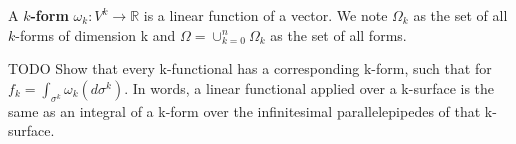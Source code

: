 \begin{defn}
	A \textbf{$k$-form} $\omega_k : V^k \to \mathbb{R}$ is a linear function of a vector. We note $\Omega_k$ as the set of all $k$-forms of dimension k and $\Omega = \cup_{k=0}^n\Omega_k$ as the set of all forms. 
\end{defn}

\begin{prop}
	TODO Show that every k-functional has a corresponding k-form, such that for $f_k = \int_{\sigma^k} \omega_k(d\sigma^k)$. In words, a linear functional applied over a k-surface is the same as an integral of a k-form over the infinitesimal parallelepipedes of that k-surface. 
\end{prop}

\fi




